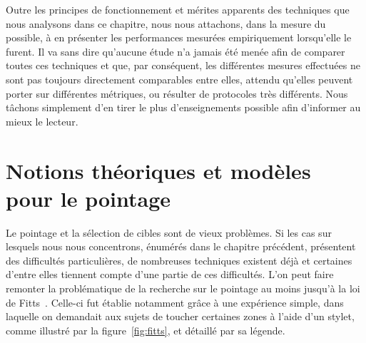 	Outre les principes de fonctionnement et mérites apparents des techniques que nous analysons dans ce chapitre, nous nous attachons, dans la mesure du possible, à en présenter les performances mesurées empiriquement lorsqu'elle le furent. Il va sans dire qu'aucune étude n'a jamais été menée afin de comparer toutes ces techniques et que, par conséquent, les différentes mesures effectuées ne sont pas toujours directement comparables entre elles, attendu qu'elles peuvent porter sur différentes métriques, ou résulter de protocoles très différents. Nous tâchons simplement d'en tirer le plus d'enseignements possible afin d'informer au mieux le lecteur.

\section{Notions théoriques et modèles pour le pointage}
	Le pointage et la sélection de cibles sont de vieux problèmes. Si les cas sur lesquels nous nous concentrons, énumérés dans le chapitre précédent, présentent des difficultés particulières, de nombreuses techniques existent déjà et certaines d'entre elles tiennent compte d'une partie de ces difficultés. L'on peut faire remonter la problématique de la recherche sur le pointage au moins jusqu'à la loi de Fitts~\cite{fitts1954information}. Celle-ci fut établie notamment grâce à une expérience simple, dans laquelle on demandait aux sujets de toucher certaines zones à l'aide d'un stylet, comme illustré par la figure~\ref{fig:fitts}, et détaillé par sa légende.
	
